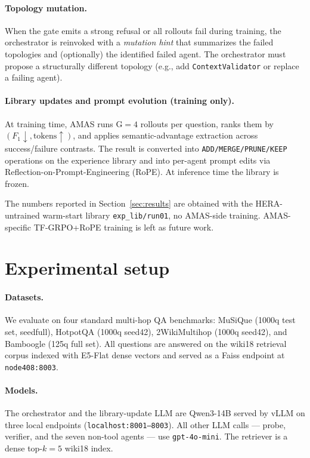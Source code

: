 \documentclass[11pt]{article}
\newcommand{\amas}{AMAS\xspace}
\newcommand{\hera}{HERA\xspace}
\newcommand{\code}[1]{\texttt{\small #1}}
\begin{document}
\paragraph{Topology mutation.}
When the gate emits a strong refusal or all rollouts fail during training,
the orchestrator is reinvoked with a \emph{mutation hint} that summarizes
the failed topologies and (optionally) the identified failed agent. The
orchestrator must propose a structurally different topology (e.g., add
\code{ContextValidator} or replace a failing agent).

\paragraph{Library updates and prompt evolution (training only).}
At training time, \amas runs G$=4$ rollouts per question, ranks them by
$(F_1 \downarrow, \text{tokens} \uparrow)$, and applies semantic-advantage
extraction across success/failure contrasts. The result is converted into
\code{ADD/MERGE/PRUNE/KEEP} operations on the experience library and into
per-agent prompt edits via Reflection-on-Prompt-Engineering (RoPE). At
inference time the library is frozen.

The numbers reported in Section~\ref{sec:results} are obtained with the
\hera-untrained warm-start library \code{exp\_lib/run01}, no \amas-side
training. \amas-specific TF-GRPO+RoPE training is left as future work.

\section{Experimental setup}

\paragraph{Datasets.}
We evaluate on four standard multi-hop QA benchmarks: MuSiQue
(1000q test set, seedfull), HotpotQA (1000q seed42), 2WikiMultihop
(1000q seed42), and Bamboogle (125q full set). All questions are answered
on the wiki18 retrieval corpus indexed with E5-Flat dense vectors and
served as a Faiss endpoint at \code{node408:8003}.

\paragraph{Models.}
The orchestrator and the library-update LLM are Qwen3-14B served by vLLM
on three local endpoints (\code{localhost:8001--8003}). All other LLM
calls --- probe, verifier, and the seven non-tool agents --- use
\code{gpt-4o-mini}. The retriever is a dense top-$k=5$ wiki18 index.
\end{document}
